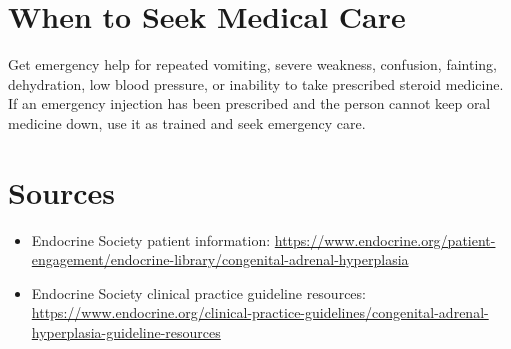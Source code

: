 \section*{When to Seek Medical Care}
Get emergency help for repeated vomiting, severe weakness, confusion, fainting, dehydration, low blood pressure, or inability to take prescribed steroid medicine. If an emergency injection has been prescribed and the person cannot keep oral medicine down, use it as trained and seek emergency care.

\section*{Sources}
\begin{itemize}
\item Endocrine Society patient information: \url{https://www.endocrine.org/patient-engagement/endocrine-library/congenital-adrenal-hyperplasia}
\item Endocrine Society clinical practice guideline resources: \url{https://www.endocrine.org/clinical-practice-guidelines/congenital-adrenal-hyperplasia-guideline-resources}
\end{itemize}
